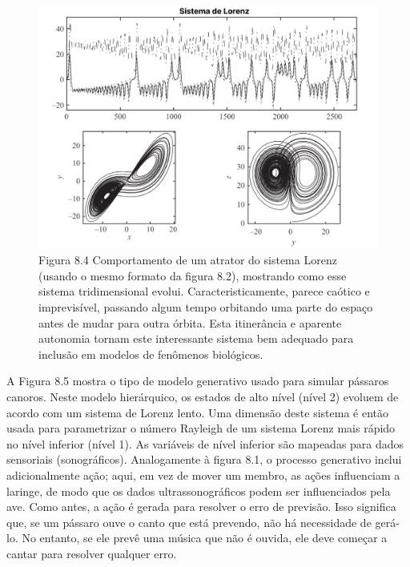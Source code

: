 \documentclass[
  12pt,
]{book}
\begin{document}
\begin{figure}
\centering
\includegraphics{images/Figura_8_4.png}
\caption{Figura 8.4 Comportamento de um atrator do sistema Lorenz (usando o mesmo formato da figura 8.2), mostrando como esse sistema tridimensional evolui. Caracteristicamente, parece caótico e imprevisível, passando algum tempo orbitando uma parte do espaço antes de mudar para outra órbita. Esta itinerância e aparente autonomia tornam este interessante sistema bem adequado para inclusão em modelos de fenômenos biológicos.}
\end{figure}

A Figura 8.5 mostra o tipo de modelo generativo usado para simular pássaros canoros. Neste modelo hierárquico, os estados de alto nível (nível 2) evoluem de acordo com um sistema de Lorenz lento. Uma dimensão deste sistema é então usada para parametrizar o número Rayleigh de um sistema Lorenz mais rápido no nível inferior (nível 1). As variáveis de nível inferior são mapeadas para dados sensoriais (sonográficos). Analogamente à figura 8.1, o processo generativo inclui adicionalmente ação; aqui, em vez de mover um membro, as ações influenciam a laringe, de modo que os dados ultrassonográficos podem ser influenciados pela ave. Como antes, a ação é gerada para resolver o erro de previsão. Isso significa que, se um pássaro ouve o canto que está prevendo, não há necessidade de gerá-lo. No entanto, se ele prevê uma música que não é ouvida, ele deve começar a cantar para resolver qualquer erro.
\end{document}
